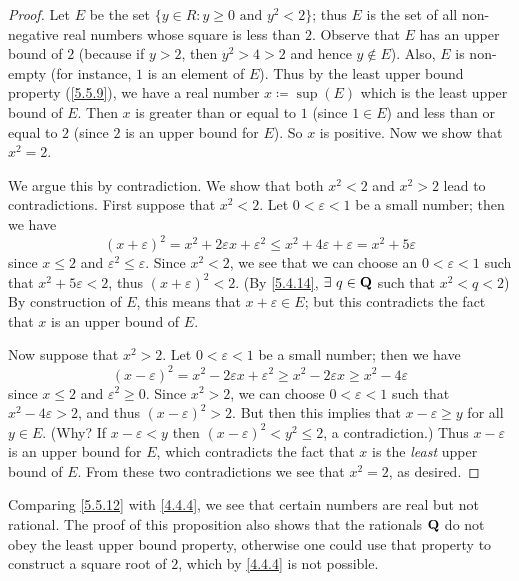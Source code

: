 \begin{proof}
  Let \(E\) be the set \(\{y \in R : y \geq 0 \text{ and } y^2 < 2\}\);
  thus \(E\) is the set of all non-negative real numbers whose square is less than \(2\).
  Observe that \(E\) has an upper bound of \(2\) (because if \(y > 2\), then \(y^2 > 4 > 2\) and hence \(y \notin E\)).
  Also, \(E\) is non-empty (for instance, \(1\) is an element of \(E\)).
  Thus by the least upper bound property (\cref{5.5.9}), we have a real number \(x \coloneqq \sup(E)\) which is the least upper bound of \(E\).
  Then \(x\) is greater than or equal to \(1\) (since \(1 \in E\)) and less than or equal to \(2\)
  (since \(2\) is an upper bound for \(E\)).
  So \(x\) is positive.
  Now we show that \(x^2 = 2\).

  We argue this by contradiction.
  We show that both \(x^2 < 2\) and \(x^2 > 2\) lead to contradictions.
  First suppose that \(x^2 < 2\).
  Let \(0 < \varepsilon < 1\) be a small number;
  then we have
  \[
    (x + \varepsilon)^2 = x^2 + 2\varepsilon x + \varepsilon^2 \leq x^2 + 4\varepsilon + \varepsilon = x^2 + 5\varepsilon
  \]
  since \(x \leq 2\) and \(\varepsilon^2 \leq \varepsilon\).
  Since \(x^2 < 2\), we see that we can choose an \(0 < \varepsilon < 1\) such that \(x^2 + 5\varepsilon < 2\), thus \((x + \varepsilon)^2 < 2\).
  (By \cref{5.4.14}, \(\exists\ q \in \mathbf{Q}\) such that \(x^2 < q < 2\))
  By construction of \(E\), this means that \(x + \varepsilon \in E\);
  but this contradicts the fact that \(x\) is an upper bound of \(E\).

  Now suppose that \(x^2 > 2\).
  Let \(0 < \varepsilon < 1\) be a small number;
  then we have
  \[
    (x - \varepsilon)^2 = x^2 - 2\varepsilon x + \varepsilon^2 \geq x^2 - 2\varepsilon x \geq x^2 - 4\varepsilon
  \]
  since \(x \leq 2\) and \(\varepsilon^2 \geq 0\).
  Since \(x^2 > 2\), we can choose \(0 < \varepsilon < 1\) such that \(x^2 - 4\varepsilon > 2\), and thus \((x - \varepsilon)^2 > 2\).
  But then this implies that \(x - \varepsilon \geq y\) for all \(y \in E\).
  (Why? If \(x - \varepsilon < y\) then \((x - \varepsilon)^2 < y^2 \leq 2\), a contradiction.)
  Thus \(x - \varepsilon\) is an upper bound for \(E\), which contradicts the fact that \(x\) is the \emph{least} upper bound of \(E\).
  From these two contradictions we see that \(x^2 = 2\), as desired.
\end{proof}

\begin{remark}\label{5.5.13}
  Comparing \cref{5.5.12} with \cref{4.4.4}, we see that certain numbers are real but not rational.
  The proof of this proposition also shows that the rationals \(\mathbf{Q}\) do not obey the least upper bound property, otherwise one could use that property to construct a square root of \(2\), which by \cref{4.4.4} is not possible.
\end{remark}

